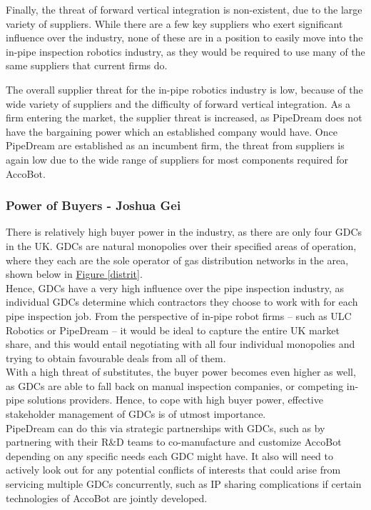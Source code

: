 \documentclass[11pt]{article}		%
\newcommand{\figref}[1]{\hyperref[#1]{Figure \ref*{#1}}}    %
\begin{document}
				Finally, the threat of forward vertical integration is non-existent, due to the large variety of suppliers.
				While there are a few key suppliers who exert significant influence over the industry, none of these are in a position to easily move into the in-pipe inspection robotics industry, as they would be required to use many of the same suppliers that current firms do.
				
				The overall supplier threat for the in-pipe robotics industry is low, because of the wide variety of suppliers and the difficulty of forward vertical integration.
				As a firm entering the market, the supplier threat is increased, as PipeDream does not have the bargaining power which an established company would have.
				Once PipeDream are established as an incumbent firm, the threat from suppliers is again low due to the wide range of suppliers for most components required for AccoBot.
				
		    \subsubsection{Power of Buyers - Joshua Gei}
			
    			There is relatively high buyer power in the industry, as there are only four GDCs in the UK. GDCs are natural monopolies over their specified areas of operation, where they each are the sole operator of gas distribution networks in the area, shown below in \figref{distrit}.
                \\\hspace*{3ex}Hence, GDCs have a very high influence over the pipe inspection industry, as individual GDCs determine which contractors they choose to work with for each pipe inspection job. From the perspective of in-pipe robot firms – such as ULC Robotics or PipeDream – it would be ideal to capture the entire UK market share, and this would entail negotiating with all four individual monopolies and trying to obtain favourable deals from all of them. 
                \\\hspace*{3ex}With a high threat of substitutes, the buyer power becomes even higher as well, as GDCs are able to fall back on manual inspection companies, or competing in-pipe solutions providers. Hence, to cope with high buyer power, effective stakeholder management of GDCs is of utmost importance.
                \\\hspace*{3ex}PipeDream can do this via strategic  partnerships with GDCs, such as by partnering with their R\&D teams to co-manufacture and customize AccoBot depending on any specific needs each GDC might have. It also will need to actively look out for any potential conflicts of interests that could arise from servicing multiple GDCs concurrently, such as IP sharing complications if certain technologies of AccoBot are jointly developed. 
				
\end{document}
